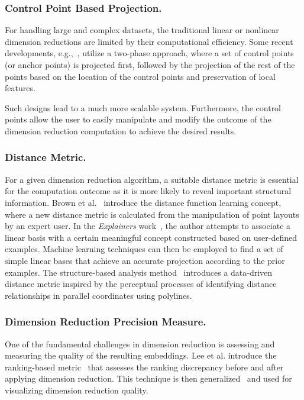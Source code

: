 \subsubsection{Control Point Based Projection.}
For handling large and complex datasets, the traditional linear or nonlinear dimension reductions are limited by their computational efficiency.
%
Some recent developments, e.g.,~\cite{SilvaTenenbaum2004, PaulovichSilvaNonato2010, PaulovichElerPoco2011}, utilize a two-phase approach, where a set of control points (or anchor points) is projected first, followed by the projection of the rest of the points based on the location of the control points and preservation of local features.

Such designs lead to a much more scalable system.
%
Furthermore, the control points allow the user to easily manipulate and modify the outcome of the dimension reduction computation to achieve the desired results.

\subsubsection{Distance Metric.}
For a given dimension reduction algorithm, a suitable distance metric is essential for the computation outcome as it is more likely to reveal important structural information.
Brown et al.~\cite{BrownLiuBrodley2012} introduce the distance function learning concept, where a new distance metric is calculated from the manipulation of point layouts by an expert user.
In the \emph{Explainers} work~\cite{Gleicher2013}, the author attempts to associate a linear basis with a certain meaningful concept constructed based on user-defined examples. Machine learning techniques can then be employed to find a set of simple linear bases that achieve an accurate projection according to the prior examples.
The structure-based analysis method~\cite{LeeMcDonnellZelenyuk2014} introduces a data-driven distance metric inspired by the perceptual processes of identifying distance relationships in parallel coordinates using polylines.

\subsubsection{Dimension Reduction Precision Measure.}
One of the fundamental challenges in dimension reduction is assessing and measuring the quality of the resulting embeddings.
Lee et al. introduce the ranking-based metric~\cite{LeeVerleysen2009} that assesses the ranking discrepancy before and after applying dimension reduction.
This technique is then generalized~\cite{MokbelLueksGisbrecht2013} and used for visualizing dimension reduction quality.

